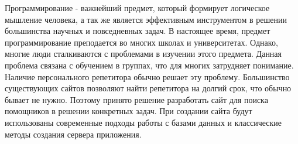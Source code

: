 \Introduction

Программирование - важнейший предмет, который формирует логическое мышление человека, а так же является эффективным инструментом в решении большинства научных и повседневных задач. В настоящее время, предмет программирование преподается во многих школах и университетах. Однако, многие люди сталкиваются с проблемами в изучении этого предмета. Данная проблема связана с обучением в группах, что для многих затрудняет понимание. Наличие персонального репетитора обычно решает эту проблему. Большинство существующих сайтов позволяют найти репетитора на долгий срок, что обычно бывает не нужно. Поэтому принято решение разработать сайт для поиска помощников в решении конкретных задач. При создании сайта будут использованы современные подходы работы с базами данных и классические методы создания сервера приложения.